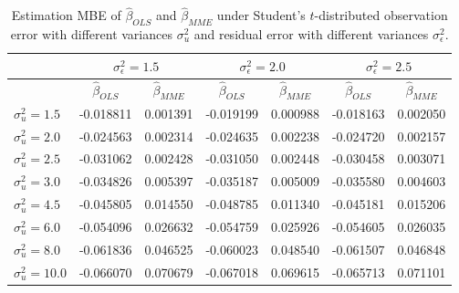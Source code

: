 \documentclass{article}
\begin{document}
\begin{table}[ht]
    \centering
    \caption{Estimation MBE of $\hat{\beta}_{OLS}$ and $\hat{\beta}_{MME}$ under Student's $t$-distributed observation error with different variances $\sigma^2_u$ and residual error with different variances $\sigma^2_\epsilon$.}
    \label{Tab:MBE_t}
    \begin{tabular}[t]{lcccccc}
        \hline
        &\multicolumn{2}{c}{$\sigma^2_\epsilon=1.5$}&\multicolumn{2}{c}{$\sigma^2_\epsilon=2.0$}&\multicolumn{2}{c}{$\sigma^2_\epsilon=2.5$}\\
        \hline
        &$\hat{\beta}_{OLS}$&$\hat{\beta}_{MME}$&$\hat{\beta}_{OLS}$&$\hat{\beta}_{MME}$&$\hat{\beta}_{OLS}$&$\hat{\beta}_{MME}$\\
        \hline
        $\sigma^2_u = 1.5$&-0.018811&0.001391&-0.019199&0.000988&-0.018163&0.002050\\
        $\sigma^2_u = 2.0$&-0.024563&0.002314&-0.024635&0.002238&-0.024720&0.002157\\
        $\sigma^2_u = 2.5$&-0.031062&0.002428&-0.031050&0.002448&-0.030458&0.003071\\
        $\sigma^2_u = 3.0$&-0.034826&0.005397&-0.035187&0.005009&-0.035580&0.004603\\
        $\sigma^2_u = 4.5$&-0.045805&0.014550&-0.048785&0.011340&-0.045181&0.015206\\
        $\sigma^2_u = 6.0$&-0.054096&0.026632&-0.054759&0.025926&-0.054605&0.026035\\
        $\sigma^2_u = 8.0$&-0.061836&0.046525&-0.060023&0.048540&-0.061507&0.046848\\
        $\sigma^2_u = 10.0$&-0.066070&0.070679&-0.067018&0.069615&-0.065713&0.071101\\
        \hline
    \end{tabular}
\end{table}
\end{document}
